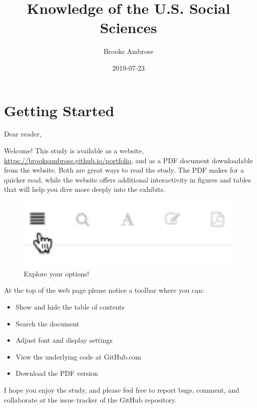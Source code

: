 \documentclass[]{book}
\title{Knowledge of the U.S. Social Sciences}
\author{Brooks Ambrose}
\date{2019-07-23}
\providecommand{\tightlist}{%
  \setlength{\itemsep}{0pt}\setlength{\parskip}{0pt}}
\theoremstyle{definition}
\theoremstyle{definition}
\theoremstyle{definition}
\theoremstyle{remark}
\begin{document}
\maketitle

{
\setcounter{tocdepth}{2}
\tableofcontents
}
\listoftables
\listoffigures
\hypertarget{getting-started}{%
\chapter*{Getting Started}\label{getting-started}}


Dear reader,

Welcome! This study is available as a website,
\url{https://brooksambrose.github.io/portfolio}, and as a PDF document
downloadable from the website. Both are great ways to read the study.
The PDF makes for a quicker read, while the website offers additional
interactivity in figures and tables that will help you dive more deeply
into the exhibits.

\begin{figure}

{\centering \includegraphics[width=6.94in]{img/toolbar} 

}

\caption{Explore your options!}\label{fig:toolbar}
\end{figure}

At the top of the web page please notice a toolbar where you can:

\begin{itemize}
\tightlist
\item
  Show and hide the table of contents
\item
  Search the document
\item
  Adjust font and display settings
\item
  View the underlying code at GitHub.com
\item
  Download the PDF version
\end{itemize}

I hope you enjoy the study, and please feel free to report bugs,
comment, and collaborate at the issue tracker of the GitHub repository.
\end{document}
